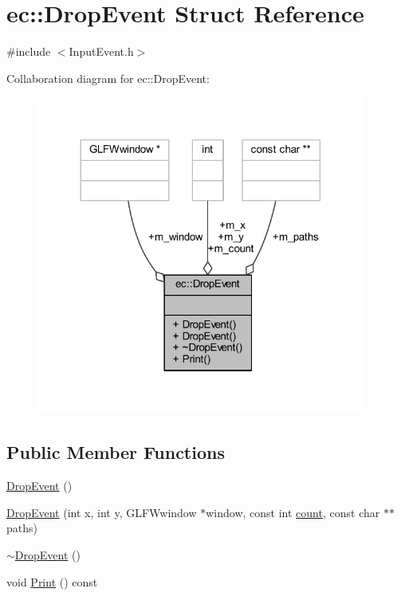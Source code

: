\hypertarget{structec_1_1_drop_event}{}\section{ec\+:\+:Drop\+Event Struct Reference}
\label{structec_1_1_drop_event}


{\ttfamily \#include $<$Input\+Event.\+h$>$}



Collaboration diagram for ec\+:\+:Drop\+Event\+:
\nopagebreak
\begin{figure}[H]
\begin{center}
\leavevmode
\includegraphics[width=305pt]{structec_1_1_drop_event__coll__graph}
\end{center}
\end{figure}
\subsection*{Public Member Functions}
\begin{DoxyCompactItemize}
\item 
\mbox{\hyperlink{structec_1_1_drop_event_a6ae6f5be022c3809bc204c365dc11cbc}{Drop\+Event}} ()
\item 
\mbox{\hyperlink{structec_1_1_drop_event_a747bca8a2d976f326dd9eb6d18bd8712}{Drop\+Event}} (int x, int y, G\+L\+F\+Wwindow $\ast$window, const int \mbox{\hyperlink{namespaceec_a5de6bdb8c4b2ed6e590e721ec998f964ae2942a04780e223b215eb8b663cf5353}{count}}, const char $\ast$$\ast$paths)
\item 
\mbox{\hyperlink{structec_1_1_drop_event_ad68bca5b7ca0c65690fc85d682d057db}{$\sim$\+Drop\+Event}} ()
\item 
void \mbox{\hyperlink{structec_1_1_drop_event_a027a7f2198874f6a2267b7c22f9ff2b7}{Print}} () const
\end{DoxyCompactItemize}
